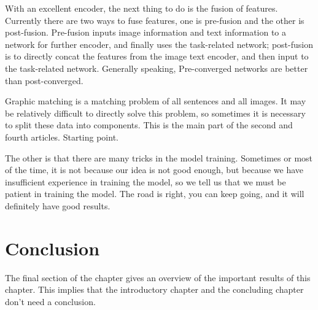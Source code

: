 With an excellent encoder, the next thing to do is the fusion of features. Currently there are two ways to fuse features, one is pre-fusion and the other is post-fusion. Pre-fusion inputs image information and text information to a network for further encoder, and finally uses the task-related network; post-fusion is to directly concat the features from the image text encoder, and then input to the task-related network. Generally speaking, Pre-converged networks are better than post-converged.

Graphic matching is a matching problem of all sentences and all images. It may be relatively difficult to directly solve this problem, so sometimes it is necessary to split these data into components. This is the main part of the second and fourth articles. Starting point.

The other is that there are many tricks in the model training. Sometimes or most of the time, it is not because our idea is not good enough, but because we have insufficient experience in training the model, so we tell us that we must be patient in training the model. The road is right, you can keep going, and it will definitely have good results.

\section{Conclusion}
The final section of the chapter gives an overview of the important results
of this chapter. This implies that the introductory chapter and the
concluding chapter don't need a conclusion.



